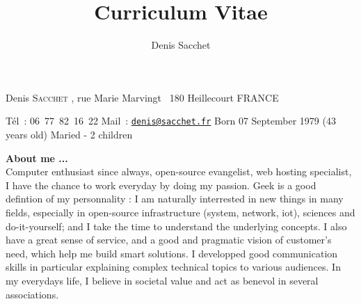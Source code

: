 \documentclass[dvipdfmx]{article}
\title{Curriculum Vitae}
\author{Denis Sacchet}
\begin{document}
\noindent\hspace*{\tabcolsep}
\begin{minipage}{0.5\linewidth}
{\large Denis \textsc{Sacchet}}
, rue Marie Marvingt
~180 Heillecourt
\newline FRANCE
\newline ~
\end{minipage}
\begin{minipage}{0.5\linewidth}
T\'el~: 06~77~82~16~22
\newline Mail~: \texttt{\href{mailto:denis@sacchet.fr}{denis@sacchet.fr}}
\newline Born 07 September 1979 (43 years old)
\newline Maried - 2 children
\newline ~
\end{minipage}

{\large \textbf{About me ...}}\\
Computer enthusiast since always, open-source evangelist, web hosting specialist, I have the chance to work everyday by doing my passion. Geek is a good defintion of my personnality : I am naturally interrested in new things in many fields, especially in open-source infrastructure (system, network, iot), sciences and do-it-yourself; and I take the time to understand the underlying concepts. I also have a great sense of service, and a good and pragmatic vision of customer's need, which help me build smart solutions. I developped good communication skills in particular explaining complex technical topics to various audiences. In my everydays life, I believe in societal value and act as benevol in several associations.
\end{document}
